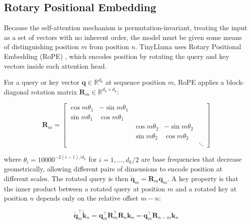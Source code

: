 \subsection{Rotary Positional Embedding}
\label{subsec:rope}

Because the self-attention mechanism is permutation-invariant, treating
the input as a set of vectors with no inherent order, the model must be
given some means of distinguishing position $m$ from position $n$. 
TinyLlama uses Rotary
Positional Embedding (RoPE) \cite{su2024roformer}, which encodes position by
rotating the query and key vectors inside each attention head. 

For a query or key vector $\mathbf{q} \in \mathbb{R}^{d_k}$ at sequence
position $m$, RoPE applies a block-diagonal rotation matrix
$\mathbf{R}_m \in \mathbb{R}^{d_k \times d_k}$:

\begin{equation}
  \mathbf{R}_m =
  \begin{bmatrix}
    \cos m\theta_1 & -\sin m\theta_1 & & & \\
    \sin m\theta_1 &  \cos m\theta_1 & & & \\
    & & \cos m\theta_2 & -\sin m\theta_2 & \\
    & & \sin m\theta_2 &  \cos m\theta_2 & \\
    & & & & \ddots
  \end{bmatrix}
  \label{eq:rope_matrix}
\end{equation}

\noindent where $\theta_i = 10000^{-2(i-1)/d_k}$ for $i = 1, \ldots,
d_k/2$ are base frequencies that decrease geometrically, allowing
different pairs of dimensions to encode position at different scales. The
rotated query is then $\tilde{\mathbf{q}}_m = \mathbf{R}_m \mathbf{q}_m$.
A key property is that the inner product between a rotated query at
position $m$ and a rotated key at position $n$ depends only on the
relative offset $m - n$:

\begin{equation}
  \tilde{\mathbf{q}}_m^\top \tilde{\mathbf{k}}_n
  = \mathbf{q}_m^\top \mathbf{R}_m^\top \mathbf{R}_n \mathbf{k}_n
  = \mathbf{q}_m^\top \mathbf{R}_{n-m} \mathbf{k}_n
  \label{eq:rope_relative}
\end{equation}

